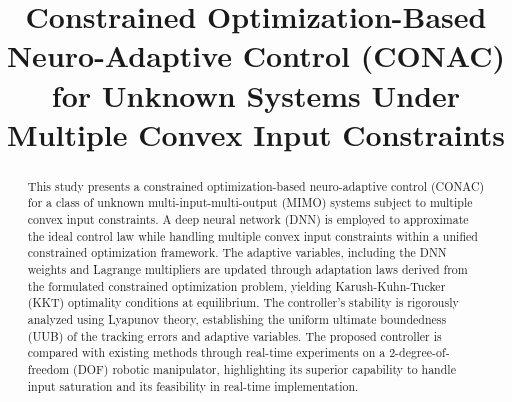 \documentclass[letterpaper, journal]{IEEEtran}
\newcommand{\version}{0.9.3} %
\providecommand{\DIFaddbegin}{} %
\providecommand{\DIFaddend}{} %
\begin{document}
\DIFaddbegin \linenumbers
\DIFaddend {}

\title{
  Constrained Optimization-Based Neuro-Adaptive Control (CONAC) for Unknown Systems Under Multiple Convex Input Constraints
} %

\author{}


%
{}

\maketitle

\begin{abstract}
  This study presents a constrained optimization-based neuro-adaptive control (CONAC) for a class of unknown multi-input-multi-output (MIMO) systems subject to multiple convex input constraints. 
  A deep neural network (DNN) is employed to approximate the ideal control law while handling multiple convex input constraints within a unified constrained optimization framework.
  The adaptive variables, including the DNN weights and Lagrange multipliers are updated through adaptation laws derived from the formulated constrained optimization problem, yielding Karush-Kuhn-Tucker (KKT) optimality conditions at equilibrium.
  The controller's stability is rigorously analyzed using Lyapunov theory, establishing the uniform ultimate boundedness (UUB) of the tracking errors and adaptive variables.
  The proposed controller is compared with existing methods through real-time experiments on a 2-degree-of-freedom (DOF) robotic manipulator, highlighting its superior capability to handle input saturation and its feasibility in real-time implementation.
\end{abstract}
\end{document}
